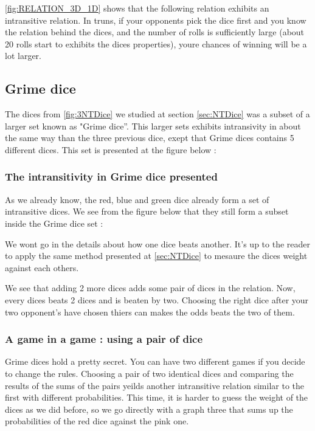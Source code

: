 \documentclass{article}
\begin{document}
    
    \ref{fig:RELATION_3D_1D} shows that the following relation exhibits an
    intransitive relation. In truns, if your opponents pick the dice first and
    you know the relation behind the dices, and the number of rolls is
    sufficiently large (about 20 rolls start to exhibits the dices properties),
    youre chances of winning will be a lot larger.

\subsection{Grime dice}
    
    The dices from \ref{fig:3NTDice} we studied at section \ref{sec:NTDice} was
    a subset of a larger set known as "Grime dice''. This larger sets exhibits
    intransivity in about the same way than the three previous dice, exept that
    Grime dices contains 5 different dices. This set is presented at the figure
    below :
    
    
    \subsubsection{The intransitivity in Grime dice presented}
    
    As we already know, the red, blue and green dice already form a set of
    intransitive dices. We see from the figure below that they still form a
    subset inside the Grime dice set :
    
    We wont go in the details about how one dice beats another. It's up to the
    reader to apply the same method presented at \ref{sec:NTDice} to mesaure the
    dices weight against each others. 
    
    We see that adding 2 more dices adds some pair of dices in the relation.
    Now, every dices beats 2 dices and is beaten by two. Choosing the right dice
    after your two opponent's have chosen thiers can makes the odds beats the
    two of them.
    
    \subsubsection{A game in a game : using a pair of dice}
    
    Grime dices hold a pretty secret. You can have two different games 
    if you decide to change the rules. Choosing a pair of two identical dices
    and comparing the results of the sums of the pairs yeilds another
    intransitive relation similar to the first with different probabilities.
    This time, it is harder to guess the weight of the dices as we did before,
    so we go directly with a graph three that sums up the probabilities of the
    red dice against the pink one. 
    
\end{document}
